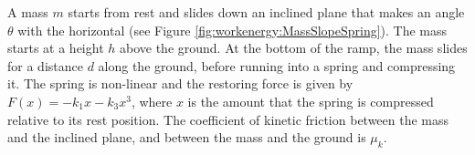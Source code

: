 \question A mass $m$ starts from rest and slides down an inclined plane that makes an angle $\theta$ with the horizontal (see Figure \ref{fig:workenergy:MassSlopeSpring}). The mass starts at a height $h$ above the ground. At the bottom of the ramp, the mass slides for a distance $d$ along the ground, before running into a spring and compressing it. The spring is non-linear and the restoring force is given by $F(x)=-k_1x-k_3x^3$, where $x$ is the amount that the spring is compressed relative to its rest position. The coefficient of kinetic friction between the mass and the inclined plane, and between the mass and the ground is $\mu_k$. 
\begin{finalanswer}
\end{finalanswer}
